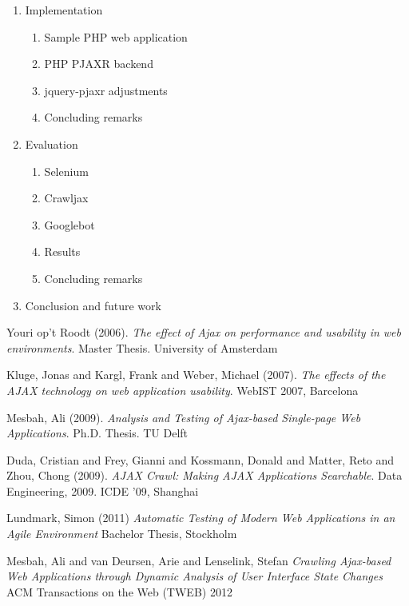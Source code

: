 \documentclass[f,bachelor,binding,twoside,palatino]{WeSTthesis}
\def \pjaxr {PJAXR}
\def \jqueryPjaxr {jquery-pjaxr}
\begin{document}
\begin{enumerate}
  \item Implementation
  \begin{enumerate}[label*=\arabic*.]
    \item Sample PHP web application
    \item PHP \pjaxr{} backend
    \item \jqueryPjaxr{} adjustments
    \item Concluding remarks
  \end{enumerate}
  \item Evaluation
  \begin{enumerate}[label*=\arabic*.]
    \item Selenium
    \item Crawljax
    \item Googlebot
    \item Results
    \item Concluding remarks
  \end{enumerate}
  \item Conclusion and future work

\end{enumerate}

\printglossary

\begin{thebibliography}{9}

  Youri op't Roodt (2006).
  \emph{The effect of Ajax on performance and usability in web environments}.
  Master Thesis. University of Amsterdam

  Kluge, Jonas and Kargl, Frank and Weber, Michael (2007).
  \emph{The effects of the AJAX technology on web application usability}.
  WebIST 2007, Barcelona

  Mesbah, Ali (2009).
  \emph{Analysis and Testing of Ajax-based Single-page Web Applications}.
  Ph.D. Thesis. TU Delft

  Duda, Cristian and Frey, Gianni and Kossmann, Donald and Matter, Reto and Zhou, Chong (2009).
  \emph{AJAX Crawl: Making AJAX Applications Searchable}.
  Data Engineering, 2009. ICDE '09, Shanghai
  
  Lundmark, Simon (2011)
  \emph{Automatic Testing of Modern Web Applications in an Agile Environment}
  Bachelor Thesis, Stockholm

  Mesbah, Ali and van Deursen, Arie and Lenselink, Stefan
  \emph{Crawling {Ajax}-based Web Applications through Dynamic Analysis of User Interface State Changes}
  ACM Transactions on the Web (TWEB) 2012
  
\end{thebibliography}
\end{document}
